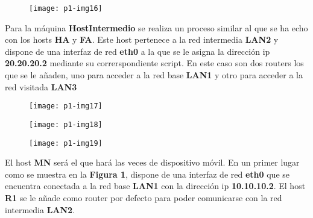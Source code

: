 \documentclass[10pt]{article}
\begin{document}
\begin{figure}[H]
	\begin{center}
 		\texttt{[image: p1-img16]}
	\end{center} 
\end{figure}


Para la máquina \textbf{HostIntermedio} se realiza un proceso similar al que se ha echo con los hosts \textbf{HA} y \textbf{FA}. Este host pertenece a la red intermedia \textbf{LAN2} y dispone de una interfaz de red \textbf{eth0} a la que se le asigna la dirección ip \textbf{20.20.20.2} mediante su correrspondiente script. En este caso son dos routers los que se le añaden, uno para acceder a la red base \textbf{LAN1} y otro para acceder a la red visitada \textbf{LAN3}\\

 \begin{figure}[H]
	\begin{center}
 		\texttt{[image: p1-img17]}
	\end{center} 
\end{figure}

\begin{figure}[H]
	\begin{center}
 		\texttt{[image: p1-img18]}
	\end{center} 
\end{figure}

\begin{figure}[H]
	\begin{center}
 		\texttt{[image: p1-img19]}
	\end{center} 
\end{figure}

El host \textbf{MN} será el que hará las veces de dispositivo móvil. En un primer lugar como se muestra en la \textbf{Figura 1}, dispone de una interfaz de red \textbf{eth0} que se encuentra conectada a la red base \textbf{LAN1} con la dirección ip \textbf{10.10.10.2}. El host \textbf{R1} se le añade como router por defecto para poder comunicarse con la red intermedia \textbf{LAN2}. \\
\end{document}
